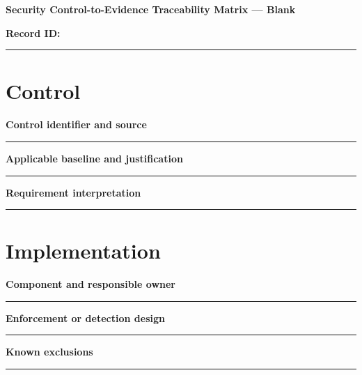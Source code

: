 \documentclass[11pt,letterpaper]{article}
\begin{document}
\begin{center}{\LARGE\bfseries Security Control-to-Evidence Traceability Matrix --- Blank}\par
\vspace{4pt}{\small Print-ready unfilled assessment instrument}\par
\end{center}
\noindent\textbf{Record ID:} \rule{2.6in}{0.4pt}\par
\section{Control}
\noindent\textbf{Control identifier and source}\par
\vspace{1.1em}\noindent\rule{0.96\linewidth}{0.4pt}\par\vspace{0.65em}
\noindent\textbf{Applicable baseline and justification}\par
\vspace{1.1em}\noindent\rule{0.96\linewidth}{0.4pt}\par\vspace{0.65em}
\noindent\textbf{Requirement interpretation}\par
\vspace{1.1em}\noindent\rule{0.96\linewidth}{0.4pt}\par\vspace{0.65em}
\section{Implementation}
\noindent\textbf{Component and responsible owner}\par
\vspace{1.1em}\noindent\rule{0.96\linewidth}{0.4pt}\par\vspace{0.65em}
\noindent\textbf{Enforcement or detection design}\par
\vspace{1.1em}\noindent\rule{0.96\linewidth}{0.4pt}\par\vspace{0.65em}
\noindent\textbf{Known exclusions}\par
\vspace{1.1em}\noindent\rule{0.96\linewidth}{0.4pt}\par\vspace{0.65em}
\end{document}
